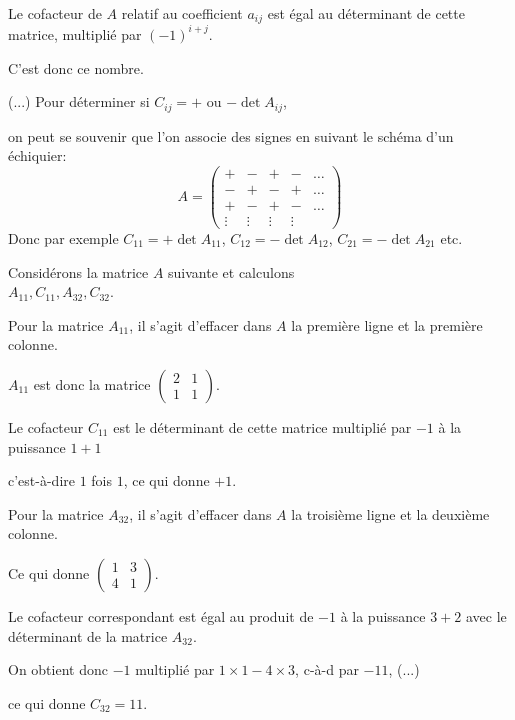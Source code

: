 \change
Le cofacteur de $A$ relatif au coefficient $a_{ij}$ est égal au déterminant de cette matrice, multiplié par $(-1)^{i+j}$.

\change
C'est donc ce nombre.

\change
(...)
\newpage	
Pour déterminer si $C_{ij} = +$ ou $ -\det A_{ij}$, 

\change
on peut se souvenir que l'on associe des signes en suivant le schéma d'un échiquier:
$$  A = 
\begin{pmatrix}
+ & - & + & - &\dots\\
- & + & - & + &\dots \\
+ & - & + & - &\dots\\
\vdots & \vdots & \vdots & \vdots &          
\end{pmatrix}
$$
Donc par exemple $C_{11} = +\det A_{11}$, $C_{12} = - \det A_{12}$,  $C_{21} = - \det A_{21}$ etc.

\diapo
Considérons la matrice $ A $ suivante et calculons 
\\
$A_{11}, C_{11}, A_{32}, C_{32}$.

\change
Pour la matrice $A_{11}$, il s'agit d'effacer dans $A$ la première ligne et la première colonne.

\change
$A_{11}$ est  donc la matrice 
$
\begin{pmatrix}
2 & 1\\
1 & 1  
\end{pmatrix}.$

\change
Le cofacteur $C_{11}$ est le déterminant de cette matrice multiplié par $-1$ à la puissance $1+1$

\change
c'est-à-dire $1$ fois $1$, ce qui donne $+1$.

\change
Pour la matrice $A_{32}$, il s'agit d'effacer dans $A$ la troisième ligne et la deuxième colonne.

\change
Ce qui donne
$
\begin{pmatrix}
1 & 3\\
4 & 1  
\end{pmatrix}.$

\change
Le cofacteur correspondant est égal au produit de $-1$ à la puissance $3+2$ avec le déterminant de la matrice $A_{32}$.

\change
On obtient donc $-1$ multiplié par  $1\times 1 - 4 \times 3$, c-à-d par $-11$, (...)

\change
ce qui donne $C_{32} =11$.

\diapo


